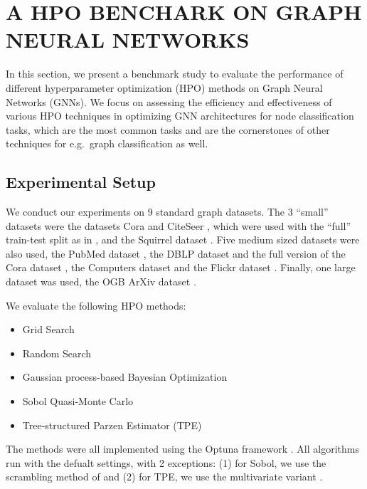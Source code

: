 \section{\uppercase{A HPO Benchark on Graph Neural Networks}}
\label{sec:benchmark}

In this section, we present a benchmark study to evaluate the performance of different hyperparameter optimization (HPO) methods on Graph Neural Networks (GNNs). We focus on assessing the efficiency and effectiveness of various HPO techniques in optimizing GNN architectures for node classification tasks, which are the most common tasks and are the cornerstones of other techniques for e.g.\ graph classification as well.

\subsection{Experimental Setup}
We conduct our experiments on 9 standard graph datasets. The 3 \enquote{small} datasets were the datasets Cora and CiteSeer \cite{yang_revisiting_2016}, which were used with the \enquote{full} train-test split as in \cite{chen_fastgcn_2018}, and the Squirrel dataset \cite{rozemberczki_multi-scale_2021}. Five medium sized datasets were also used, the PubMed dataset \cite{yang_revisiting_2016}, the DBLP dataset and the full version of the Cora dataset \cite{bojchevski_deep_2018}, the Computers dataset \cite{shchur_pitfalls_2019} and the Flickr dataset \cite{zeng_graphsaint_2019}. Finally, one large dataset was used, the OGB ArXiv dataset \cite{hu_open_2021}.

We evaluate the following HPO methods:
\begin{itemize}
	\item Grid Search
	\item Random Search
	\item Gaussian process-based Bayesian Optimization \cite{rasmussen_gaussian_2003}
	\item Sobol Quasi-Monte Carlo \cite{sobol_distribution_1967, bergstra_random_2012}
	\item Tree-structured Parzen Estimator (TPE) \cite{bergstra_algorithms_2011}
\end{itemize}
The methods were all implemented using the Optuna framework \cite{akiba_optuna_2019}. All algorithms run with the defualt settings, with 2 exceptions: (1) for Sobol, we use the scrambling method of \cite{matousek_l2-discrepancy_1998} and (2) for TPE, we use the multivariate variant \cite{falkner_bohb_2018}.

